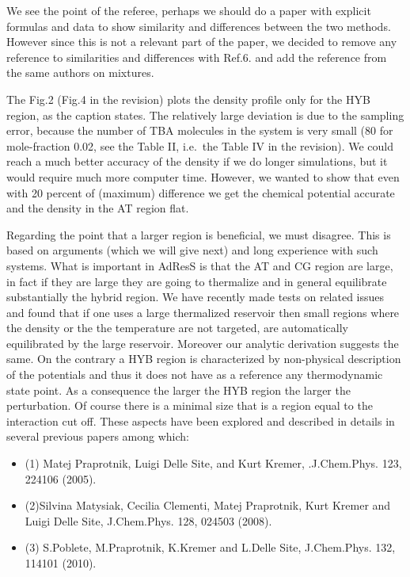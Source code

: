 \documentclass[12pt]{article}
\begin{document}
We see the point of the referee, perhaps we should do a paper with explicit formulas and data to show similarity and differences between the two methods.
However since this is not a relevant part of the paper, we decided to remove any reference to similarities and differences with Ref.6.
and add the reference from the same authors on mixtures.


{\color{blue}{\it (8) Fig. 2. Please indicate the locations of the HYB
    domain. A difference of about 20 percent in density is not small,
    although *inside* the AT domain, the g(r) might not be too
    sensible to such density difference (as shown in the fig.). On the
    other hand, contrary with what the authors state below, a large
    transition region is beneficial, because molecules have larger
    space to adapt to the change in resolution. Please correct this.}}


{The Fig.2 (Fig.4 in the revision) plots the density profile only for the HYB region, as the caption states.}
{The relatively large deviation is due to the sampling error, because the
  number of TBA molecules in the system is very small (80 for mole-fraction 0.02, see the Table II, i.e.~the Table IV in the revision).
  We could reach a much better accuracy of the density if we do longer simulations,
  but it would require much more computer time.}
However, we wanted to show that even with 20 percent of
(maximum) difference we get the chemical potential accurate and the
density in the AT region flat.

Regarding the point that a larger
region is beneficial, we must disagree. This is based on arguments
(which we will give next) and long experience with such systems. What
is important in AdResS is that the AT and CG region are large, in fact
if they are large they are going to thermalize and in general
equilibrate substantially the hybrid region.  We have recently made
tests on related issues and found that if one uses a large thermalized
reservoir then small regions where the density or the the temperature
are not targeted, are automatically equilibrated by the large
reservoir. Moreover our analytic derivation suggests the same.  On the
contrary a HYB region is characterized by non-physical description of
the potentials and thus it does not have as a reference any
thermodynamic state point. As a consequence the larger the HYB region
the larger the perturbation. Of course there is a minimal size that is
a region equal to the interaction cut off.  These aspects have been
explored and described in details in several previous papers among
which:
\begin{itemize}
\item (1) Matej Praprotnik, Luigi Delle Site, and Kurt Kremer, .J.Chem.Phys. 123, 224106 (2005).
\item (2)Silvina Matysiak, Cecilia Clementi, Matej Praprotnik, Kurt Kremer and Luigi Delle Site, J.Chem.Phys. 128, 024503 (2008).
\item (3) S.Poblete, M.Praprotnik, K.Kremer and L.Delle Site,  J.Chem.Phys. 132, 114101 (2010).
\end{itemize}
\end{document}
